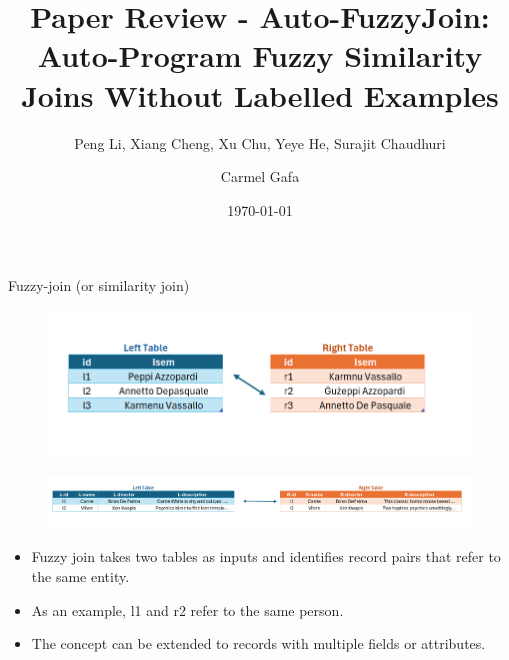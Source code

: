 \documentclass[8pt]{beamer} %
\title{Paper Review - Auto-FuzzyJoin: Auto-Program Fuzzy Similarity Joins Without Labelled Examples}
\subtitle{Peng Li, Xiang Cheng, Xu Chu, Yeye He, Surajit Chaudhuri}
\date{\today}
\author{Carmel Gafa}
\begin{document}


\begin{frame}[plain]
    \maketitle
\end{frame}

\small
\begin{frame}{Fuzzy-join (or similarity join)}
	\begin{figure}
		\centering
		\includegraphics[width=0.7\linewidth]{FuzzyJoin}
	\end{figure}

	\begin{figure}
		\centering
		\includegraphics[width=1\linewidth]{img/FuzzyJoin_2}
	\end{figure}

	\begin{itemize}
		\item Fuzzy join takes two tables as inputs and identifies record pairs that refer to the same entity.
		\item As an example, l1 and r2 refer to the same person.
		\item The concept can be extended to records with multiple fields or attributes.
	\end{itemize}
\end{frame}
\end{document}
